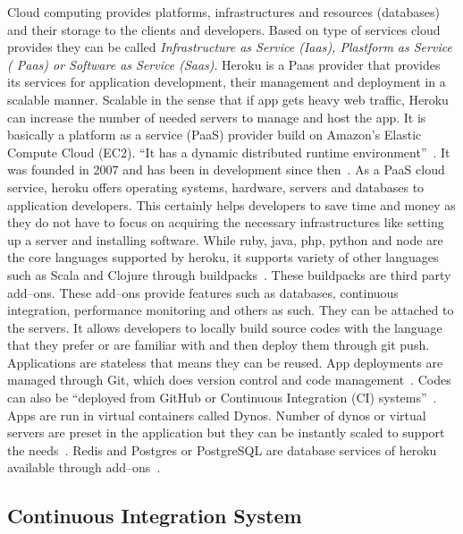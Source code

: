  Cloud computing provides platforms, infrastructures and resources (databases)
 and their storage to the clients and developers. Based on type of services
 cloud provides they can be called \textit{Infrastructure as Service (Iaas),
 Plastform as Service ( Paas) or Software as Service (Saas)}. Heroku is a Paas
 provider that provides its services for application development, their management and
 deployment in a scalable manner. Scalable in the sense that if app gets 
 heavy web traffic, Heroku can increase the number of needed servers to manage
 and host the app. It is basically a platform as a service (PaaS) provider
 build on Amazon's Elastic Compute Cloud (EC2). ``It has a dynamic distributed
 runtime environment''~\cite{hid-sp18-415-www-devcenter-heroku}. It was founded
 in  2007 and has been
 in development since then~\cite{hid-sp18-415-www-wikipedia-org}.
 As a PaaS cloud service, heroku
 offers operating systems, hardware, servers and databases to application 
 developers. This certainly helps developers to save time and money as they do
 not have to focus on acquiring the necessary infrastructures like setting up 
 a server and installing software. While ruby, java, php, python and node are 
 the core languages supported by heroku, it supports variety 
 of other languages such as Scala and Clojure through 
 buildpacks~\cite{hid-sp18-415-www-wikipedia-org}.
 These buildpacks are third party add--ons. These add--ons provide features such as
 databases, continuous integration, performance monitoring and others as such. 
 They can be attached to the servers. It allows developers to locally build 
 source codes with the language that they prefer or are familiar with and then
 deploy them through git push. Applications are stateless that means they can 
 be reused. App deployments are managed through Git, which does version control
 and code management~\cite{hid-sp18-415-www-how-heroku-works}. Codes can also
 be ``deployed from GitHub or Continuous Integration (CI) 
 systems''~\cite{hid-sp18-415-www-heroku-com}.   
 Apps are run in virtual containers called Dynos. Number of dynos or virtual 
 servers are preset in the application but they can be instantly scaled to 
 support the needs~\cite{hid-sp18-415-www-how-heroku-works}. Redis and Postgres
 or PostgreSQL are database services of heroku available through 
 add--ons~\cite{hid-sp18-415-www-heroku-com}.

\subsection{Continuous Integration System}

